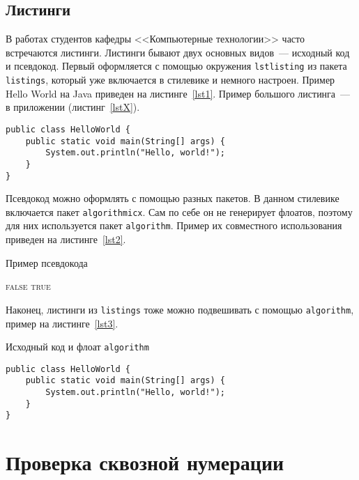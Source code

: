 \documentclass[times,numbers=noenddot]{itmo-student-thesis}
\begin{document}
\section{Листинги}

В работах студентов кафедры <<Компьютерные технологии>> часто встречаются листинги. Листинги бывают
двух основных видов~--- исходный код и псевдокод. Первый оформляется с помощью окружения \texttt{lstlisting}
из пакета \texttt{listings}, который уже включается в стилевике и немного настроен. Пример Hello World на Java
приведен на листинге~\ref{lst1}. Пример большого листинга~--- в приложении (листинг~\ref{lstX}).

\begin{lstlisting}[float=!h,caption={Пример исходного кода на Java},label={lst1}]
public class HelloWorld {
    public static void main(String[] args) {
        System.out.println("Hello, world!");
    }
}
\end{lstlisting}

Псевдокод можно оформлять с помощью разных пакетов. В данном стилевике включается пакет \texttt{algorithmicx}.
Сам по себе он не генерирует флоатов, поэтому для них используется пакет \texttt{algorithm}.
Пример их совместного использования приведен на листинге~\ref{lst2}.

\begin{algorithm}[!h]
	\caption{Пример псевдокода}\label{lst2}
	\begin{algorithmic}
		\State\Return \textsc{false}
		\EndIf
		\EndFor
		\State\Return \textsc{true}
		\EndFunction
	\end{algorithmic}
\end{algorithm}

Наконец, листинги из \texttt{listings} тоже можно подвешивать с помощью \texttt{algorithm},
пример на листинге~\ref{lst3}.

\begin{algorithm}[!h]
	\caption{Исходный код и флоат \texttt{algorithm}}\label{lst3}
	\begin{lstlisting}
public class HelloWorld {
    public static void main(String[] args) {
        System.out.println("Hello, world!");
    }
}
\end{lstlisting}
\end{algorithm}

\chapter{Проверка сквозной нумерации}
\end{document}
